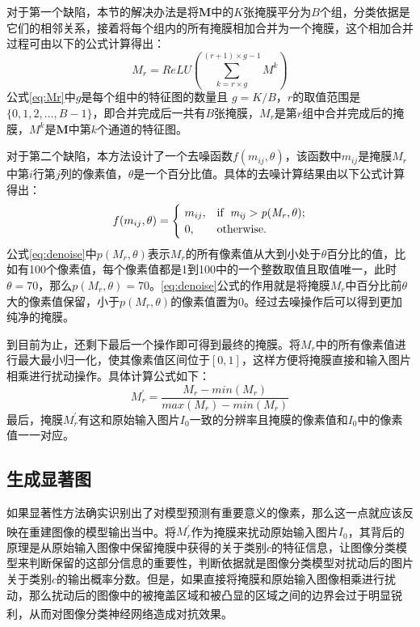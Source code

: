 对于第一个缺陷，本节的解决办法是将$\boldsymbol{M}$中的$K$张掩膜平分为$B$个组，分类依据是它们的相邻关系，接着将每个组内的所有掩膜相加合并为一个掩膜，这个相加合并过程可由以下的公式计算得出：
\begin{equation}
	M_r=ReLU(\sum_{k=r\times g}^{(r+1)\times g-1}{M^k})
	\label{eq:Mr}
\end{equation}
公式\ref{eq:Mr}中$g$是每个组中的特征图的数量且 $g=K/B$，$r$的取值范围是$\{0,1,2,\dots,B-1\}$，即合并完成后一共有$B$张掩膜，$M_r$是第$r$组中合并完成后的掩膜，$M^k$是$\boldsymbol{M}$中第$k$个通道的特征图。

对于第二个缺陷，本方法设计了一个去噪函数$f(m_{ij},\theta)$，该函数中$m_{ij}$是掩膜$M_r$中第$i$行第$j$列的像素值，$\theta$是一个百分比值。具体的去噪计算结果由以下公式计算得出：
\begin{equation}
	f(m_{ij},\theta)= \begin{cases}
		\ m_{ij}, & \rm if \enspace \it m_{ij}>p(M_r,\theta) ; \\
		\ 0, & \rm otherwise .\\
	\end{cases}
\label{eq:denoise}
\end{equation}
公式\ref{eq:denoise}中$p(M_r,\theta)$表示$M_r$的所有像素值从大到小处于$\theta$百分比的值，比如有100个像素值，每个像素值都是1到100中的一个整数取值且取值唯一，此时$\theta =70$，那么$p(M_r,\theta)=70$。\ref{eq:denoise}公式的作用就是将掩膜$M_r$中百分比前$\theta$大的像素值保留，小于$p(M_r,\theta)$的像素值置为0。经过去噪操作后可以得到更加纯净的掩膜。

到目前为止，还剩下最后一个操作即可得到最终的掩膜。将$M_r$中的所有像素值进行最大最小归一化，使其像素值区间位于$[0,1]$，这样方便将掩膜直接和输入图片相乘进行扰动操作。具体计算公式如下：
\begin{equation}
	M^{\prime}_r=\frac{M_r-min(M_r)}{max(M_r)-min(M_r)}\label{e_minmax}
\end{equation}
最后，掩膜$M^{\prime}_r$有这和原始输入图片$I_0$一致的分辨率且掩膜的像素值和$I_0$中的像素值一一对应。

\subsection{生成显著图}
如果显著性方法确实识别出了对模型预测有重要意义的像素，那么这一点就应该反映在重建图像的模型输出当中\textsuperscript{\cite{kapishnikov2019xrai}}。将$M^{\prime}_r$作为掩膜来扰动原始输入图片$I_0$，其背后的原理是从原始输入图像中保留掩膜中获得的关于类别$c$的特征信息，让图像分类模型来判断保留的这部分信息的重要性，判断依据就是图像分类模型对扰动后的图片关于类别$c$的输出概率分数。但是，如果直接将掩膜和原始输入图像相乘进行扰动，那么扰动后的图像中的被掩盖区域和被凸显的区域之间的边界会过于明显锐利，从而对图像分类神经网络造成对抗效果\textsuperscript{\cite{dabkowski2017real}}。


